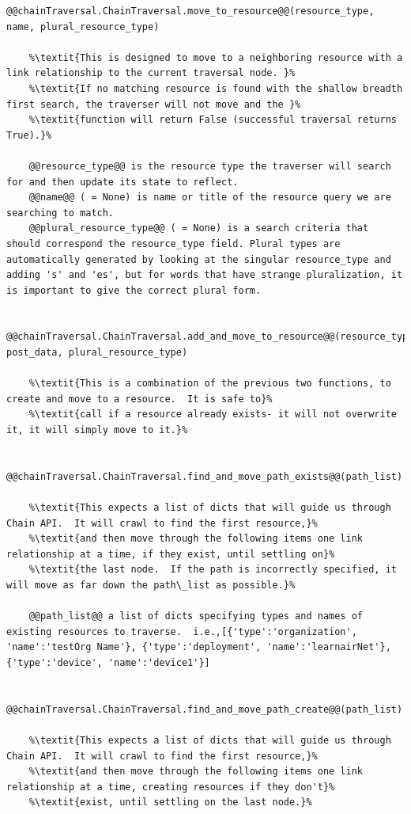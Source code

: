 \begin{lstlisting}[style=codedef]
@@chainTraversal.ChainTraversal.move_to_resource@@(resource_type, name, plural_resource_type)
	
	%\textit{This is designed to move to a neighboring resource with a link relationship to the current traversal node. }%
	%\textit{If no matching resource is found with the shallow breadth first search, the traverser will not move and the }%
	%\textit{function will return False (successful traversal returns True).}%  

	@@resource_type@@ is the resource type the traverser will search for and then update its state to reflect.
	@@name@@ ( = None) is name or title of the resource query we are searching to match.
	@@plural_resource_type@@ ( = None) is a search criteria that should correspond the resource_type field. Plural types are automatically generated by looking at the singular resource_type and adding 's' and 'es', but for words that have strange pluralization, it is important to give the correct plural form. 


@@chainTraversal.ChainTraversal.add_and_move_to_resource@@(resource_type, post_data, plural_resource_type)
	
	%\textit{This is a combination of the previous two functions, to create and move to a resource.  It is safe to}%
	%\textit{call if a resource already exists- it will not overwrite it, it will simply move to it.}%


@@chainTraversal.ChainTraversal.find_and_move_path_exists@@(path_list)
	
	%\textit{This expects a list of dicts that will guide us through Chain API.  It will crawl to find the first resource,}%
	%\textit{and then move through the following items one link relationship at a time, if they exist, until settling on}%
	%\textit{the last node.  If the path is incorrectly specified, it will move as far down the path\_list as possible.}%

	@@path_list@@ a list of dicts specifying types and names of existing resources to traverse.  i.e.,[{'type':'organization', 'name':'testOrg Name'}, {'type':'deployment', 'name':'learnairNet'}, {'type':'device', 'name':'device1'}]


@@chainTraversal.ChainTraversal.find_and_move_path_create@@(path_list)
	
	%\textit{This expects a list of dicts that will guide us through Chain API.  It will crawl to find the first resource,}%
	%\textit{and then move through the following items one link relationship at a time, creating resources if they don't}%
	%\textit{exist, until settling on the last node.}%


\end{lstlisting}
